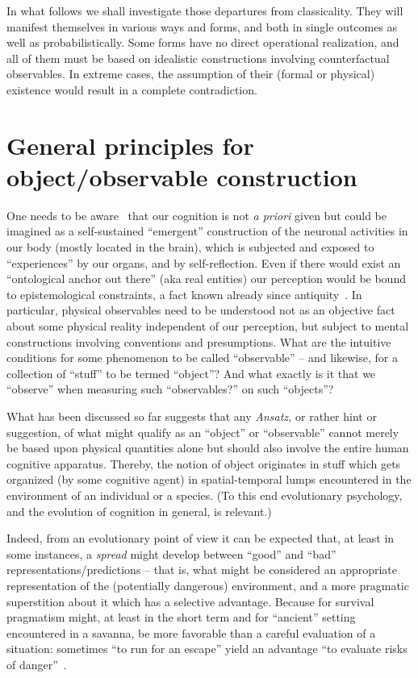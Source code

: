 In what follows we shall investigate those departures from classicality.
They will manifest themselves in various ways and forms, and both in single outcomes as well as probabilistically.
Some forms have no direct operational realization, and all of them must be based on
idealistic constructions involving counterfactual observables.
In extreme cases, the assumption of their (formal or physical) existence would result in a complete contradiction.


\section{General principles for object/observable construction}
\label{2020-b-opc}

One needs to be aware~\cite{berkeley} that our cognition is not {\it a priori} given but could be imagined as a self-sustained
``emergent'' construction of the neuronal activities in our body (mostly located in the brain),
which is subjected and exposed to ``experiences'' by our organs, and by self-reflection.
Even if there would exist an ``ontological anchor out there'' (aka real entities)
our perception would be bound to epistemological constraints, a fact known already since antiquity~\cite[514a-520a]{plato-republic}.
In particular, physical observables need to be understood not as an objective fact
about some physical reality independent of our perception,
but subject to mental constructions involving conventions and presumptions.
What are the intuitive conditions for some phenomenon to be called ``observable'' --
and likewise, for a collection of ``stuff'' to be termed ``object''?
And what exactly is it that we ``observe'' when measuring such ``observables?'' on such ``objects''?

What has been discussed so far suggests that any {\it Ansatz,} or rather hint or suggestion, of what might qualify as an ``object'' or ``observable''
cannot merely be based upon physical quantities alone but should also involve the entire human cognitive apparatus.
Thereby, the notion of object originates in stuff which gets organized (by some cognitive agent)
in spatial-temporal lumps encountered in the environment of an individual or a species.
(To this end evolutionary psychology, and the evolution of cognition in general, is relevant.)

Indeed, from an evolutionary point of view
it can be expected that, at least in some instances,
a {\em spread} might develop between
``good'' and ``bad'' representations/predictions -- that is,
what might be considered an appropriate representation of the (potentially dangerous) environment,
and a more pragmatic superstition about it which has a selective advantage.
Because for survival pragmatism might, at least in the short term and for ``ancient'' setting
encountered in a savanna, be more favorable than a careful evaluation of a situation: sometimes
``to run for an escape'' yield an advantage ``to evaluate risks of danger''~\cite{Gigerenzer-2007,Chabris-Simons-2010,kahneman2011thinking,Urbaniok-2020}.

